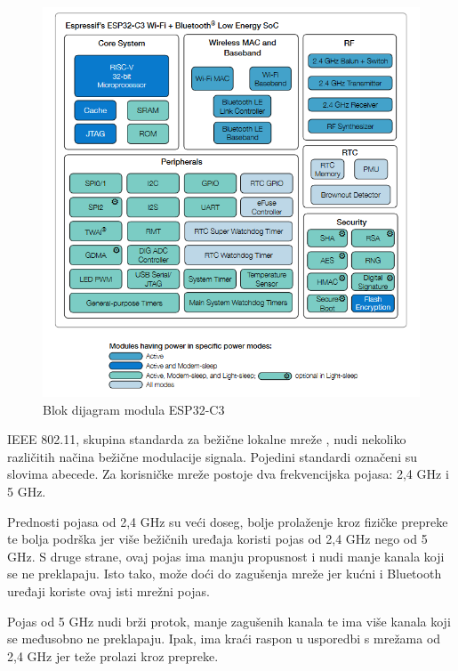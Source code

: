 \begin{figure}[ht]
	\centering
	\includegraphics[scale=0.6]{imgs/esp32block}
	\caption{Blok dijagram modula ESP32-C3 \cite{esp32manual}}
	\label{fig:esp32block}
\end{figure}

IEEE 802.11, skupina standarda za bežične lokalne mreže  \cite{ieee}, nudi nekoliko različitih načina bežične modulacije signala. Pojedini standardi označeni su slovima abecede. Za korisničke mreže postoje dva frekvencijska pojasa: 2,4 GHz i 5 GHz. 

Prednosti pojasa od 2,4 GHz su veći doseg, bolje prolaženje kroz fizičke prepreke te bolja podrška jer više bežičnih uređaja koristi pojas od 2,4 GHz nego od 5 GHz. S druge strane, ovaj pojas ima manju propusnost i nudi manje kanala koji se ne preklapaju. Isto tako, može doći do zagušenja mreže jer kućni i Bluetooth uređaji koriste ovaj isti mrežni pojas.

Pojas od 5 GHz nudi brži protok, manje zagušenih kanala te ima više kanala koji se međusobno ne preklapaju. Ipak, ima kraći raspon u usporedbi s mrežama od 2,4 GHz jer teže prolazi kroz prepreke. \cite{microsoft_ieee} 

